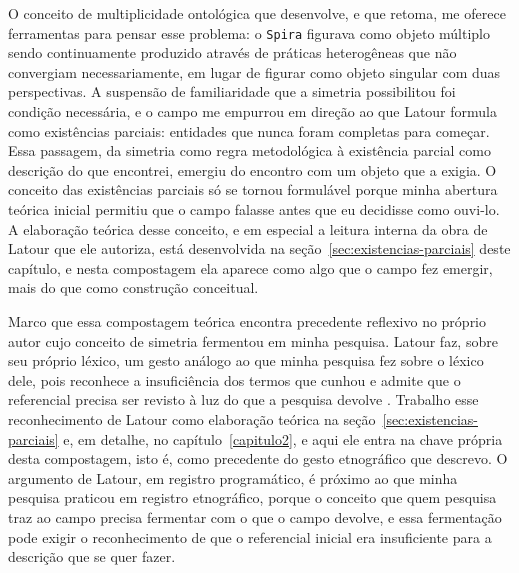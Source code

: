 O conceito de multiplicidade ontológica que \textcite{mol2002body} desenvolve, e que \textcite[p.~59]{Law2004After} retoma, me oferece ferramentas para pensar esse problema: o \texttt{Spira} figurava como objeto múltiplo sendo continuamente produzido através de práticas heterogêneas que não convergiam necessariamente, em lugar de figurar como objeto singular com duas perspectivas.
A suspensão de familiaridade que a simetria possibilitou foi condição necessária, e o campo me empurrou em direção ao que Latour formula como existências parciais: entidades que nunca foram completas para começar. Essa passagem, da simetria como regra metodológica à existência parcial como descrição do que encontrei, emergiu do encontro com um objeto que a exigia. O conceito das existências parciais só se tornou formulável porque minha abertura teórica inicial permitiu que o campo falasse antes que eu decidisse como ouvi-lo. A elaboração teórica desse conceito, e em especial a leitura interna da obra de Latour que ele autoriza, está desenvolvida na seção~\ref{sec:existencias-parciais} deste capítulo, e nesta compostagem ela aparece como algo que o campo fez emergir, mais do que como construção conceitual.

Marco que essa compostagem teórica encontra precedente reflexivo no próprio autor cujo conceito de simetria fermentou em minha pesquisa. Latour faz, sobre seu próprio léxico, um gesto análogo ao que minha pesquisa fez sobre o léxico dele, pois \textcite{Latour1999RecallingANT} reconhece a insuficiência dos termos que cunhou e admite que o referencial precisa ser revisto à luz do que a pesquisa devolve \parencite[pp.~19--25]{Latour1999RecallingANT}. Trabalho esse reconhecimento de Latour como elaboração teórica na seção~\ref{sec:existencias-parciais} e, em detalhe, no capítulo~\ref{capitulo2}, e aqui ele entra na chave própria desta compostagem, isto é, como precedente do gesto etnográfico que descrevo. O argumento de Latour, em registro programático, é próximo ao que minha pesquisa praticou em registro etnográfico, porque o conceito que quem pesquisa traz ao campo precisa fermentar com o que o campo devolve, e essa fermentação pode exigir o reconhecimento de que o referencial inicial era insuficiente para a descrição que se quer fazer.

